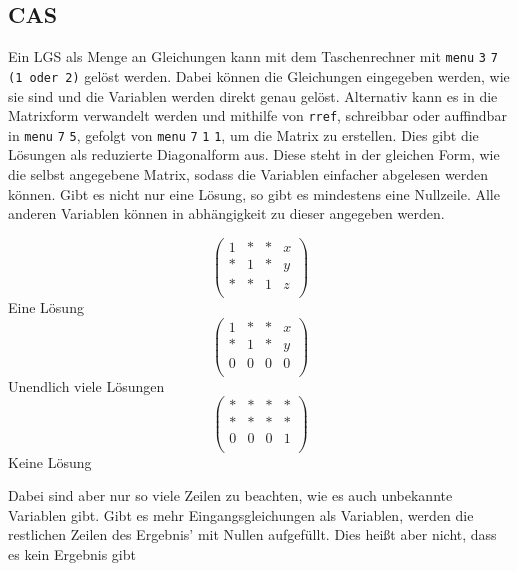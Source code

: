 \documentclass{article}
\begin{document}
\subsection{CAS}
Ein LGS als Menge an Gleichungen kann mit dem Taschenrechner mit \texttt{menu} \textrightarrow{} \texttt{3} \textrightarrow{} \texttt{7} \textrightarrow{} \texttt{(1 oder 2)} gelöst werden. Dabei können die Gleichungen eingegeben werden, wie sie sind und die Variablen werden direkt genau gelöst. \newline
Alternativ kann es in die Matrixform verwandelt werden und mithilfe von \texttt{rref}, schreibbar oder auffindbar in \texttt{menu} \textrightarrow{} \texttt{7} \textrightarrow{} \texttt{5}, gefolgt von \texttt{menu} \textrightarrow{} \texttt{7} \textrightarrow{} \texttt{1} \textrightarrow{} \texttt{1}, um die Matrix zu erstellen. Dies gibt die Lösungen als reduzierte Diagonalform aus. Diese steht in der gleichen Form, wie die selbst angegebene Matrix, sodass die Variablen einfacher abgelesen werden können. Gibt es nicht nur eine Lösung, so gibt es mindestens eine Nullzeile. Alle anderen Variablen können in abhängigkeit zu dieser angegeben werden. %
\begin{multicols}{3}
 \noindent
 \[
 \begin{pmatrix}
  1 & * & * & x \\
  * & 1 & * & y \\
  * & * & 1 & z \\
 \end{pmatrix}
 \]
 \centering Eine Lösung
 \columnbreak
 \noindent
 \[
 \begin{pmatrix}
  1 & * & * & x \\
  * & 1 & * & y \\
  0 & 0 & 0 & 0 \\
 \end{pmatrix}
 \]
 \centering Unendlich viele Lösungen  
 \columnbreak
 \noindent
 \[
 \begin{pmatrix}
  * & * & * & * \\
  * & * & * & * \\
  0 & 0 & 0 & 1 \\
 \end{pmatrix}
 \]
 \centering Keine Lösung  
\end{multicols} 
\noindent Dabei sind aber nur so viele Zeilen zu beachten, wie es auch unbekannte Variablen gibt. Gibt es mehr Eingangsgleichungen als Variablen, werden die restlichen Zeilen des Ergebnis' mit Nullen aufgefüllt. Dies heißt aber nicht, dass es kein Ergebnis gibt 
 
\end{document}
